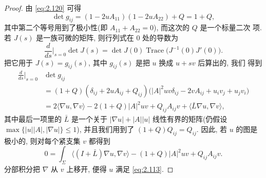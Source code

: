 \begin{proof}
由 \eqref{eq:2.120} 可得
\begin{equation}
\det g_{ij}=(1-2uA_{11})(1-2uA_{22})+Q=1+Q,
\label{eq:2.123}
\end{equation}
其中第二个等号用到了极小性(即 $A_{11}+A_{22}=0$), 而这次的 $Q$ 是一个标量二次
项. 若 $J(s)$ 是一族可微的矩阵, 则行列式在 $0$ 处的导数为
\begin{equation}
\frac{d}{ds}\Big|_{s=0}\det J(s)
 =\det J(0)\operatorname{Trace}\bigl(J^{-1}(0)J'(0)\bigr).
\label{eq:2.124}
\end{equation}
把它用于 $J(s)=g_{ij}(s)$, 其中 $g_{ij}(s)$ 是把 $u$ 换成 $u+sv$ 后算出的, 我们
得到
\begin{equation}
\begin{aligned}
\frac{d}{ds}\Big|_{s=0}&\det g_{ij}\\
&=(1+Q)(\delta_{ij}+2uA_{ij}+Q_{ij})
 \bigl(|A|^{2}uv\delta_{ij}-2vA_{ij}+u_iv_j+u_jv_i\bigr)\\
&=2\langle\nabla u,\nabla v\rangle-2(1+Q)|A|^{2}uv
 +Q_{ij}A_{ij}v+\langle\bar L\nabla u,\nabla v\rangle,
\end{aligned}
\label{eq:2.125}
\end{equation}
其中最后一项里的 $\bar L$ 是一个关于 $|\nabla u|+|A||u|$ 线性有界的矩阵(仍假设
$\max\{|u||A|,|\nabla u|\}\leq1$), 并且我们用到了 $(1+Q)Q_{ij}=Q_{ij}$. 因此,
若 $u$ 的图是极小的, 则对每个紧支集 $v$ 都得到
\begin{equation}
0=\int_\Sigma\langle(I+\bar L)\nabla u,\nabla v\rangle
 -(1+Q)|A|^{2}uv+Q_{ij}A_{ij}v.
\label{eq:2.126}
\end{equation}
分部积分把 $\nabla$ 从 $v$ 上移开, 便得 $u$ 满足 \eqref{eq:2.113}.
\end{proof}

